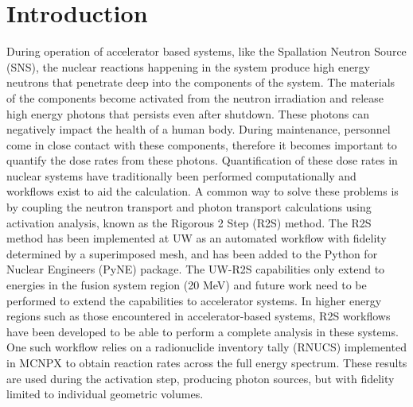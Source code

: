 \section{Introduction}\label{sc:intro}
During operation of accelerator based systems, like the Spallation Neutron
Source (SNS), the nuclear reactions happening in the system produce high
energy neutrons that penetrate deep into the components of the system.
The materials of the components become activated from the neutron irradiation
and release high energy photons that persists even after shutdown. These
photons can negatively impact the health of a human body. During maintenance,
personnel come in close contact with these components, therefore it becomes
important to quantify the dose rates from these photons.
Quantification of these dose rates in nuclear systems have traditionally been
performed computationally and workflows exist to aid the calculation.
A common way to solve these problems is by coupling the neutron transport and
photon transport calculations using activation analysis, known as the Rigorous
2 Step (R2S) method. The R2S method has been implemented at UW as an automated
workflow with fidelity determined by a superimposed mesh, and has been added
to the Python for Nuclear Engineers  (PyNE) package. The UW-R2S capabilities
only extend to energies in the fusion system region (20 MeV) and future work
need to be performed to extend the capabilities to accelerator systems.
In higher energy regions such as those encountered in accelerator-based
systems, R2S workflows have been developed to be able to perform a complete
analysis in these systems. One such workflow relies on a radionuclide
inventory tally (RNUCS) implemented in MCNPX to obtain reaction rates across
the full energy spectrum.  These results are used during the activation step,
producing photon sources, but with fidelity limited to individual geometric
volumes.
\newpage
